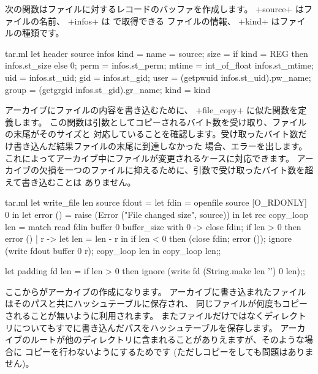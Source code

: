 \begin{answer}
次の関数はファイルに対するレコードのバッファを作成します。
\ml+source+ はファイルの名前、 \ml+infos+ は  で取得できる
ファイルの情報、 \ml+kind+ はファイルの種類です。
%
\begin{listingcodefile}{tar.ml}
let header source infos kind = {
  name = source;
  size = if kind = REG then infos.st_size else 0;
  perm = infos.st_perm;
  mtime = int_of_float infos.st_mtime;
  uid = infos.st_uid;
  gid = infos.st_gid;
  user = (getpwuid infos.st_uid).pw_name;
  group = (getgrgid infos.st_gid).gr_name;
  kind = kind }
\end{listingcodefile}
%
アーカイブにファイルの内容を書き込むために、 \ml+file_copy+ に似た関数を定義します。
この関数は引数としてコピーされるバイト数を受け取り、ファイルの末尾がそのサイズと
対応していることを確認します。受け取ったバイト数だけ書き込んだ結果ファイルの末尾に到達しなかった
場合、エラーを出します。これによってアーカイブ中にファイルが変更されるケースに対応できます。
アーカイブの欠損を一つのファイルに抑えるために、引数で受け取ったバイト数を超えて書き込むことは
ありません。
%
\begin{listingcodefile}{tar.ml}
let write_file len source fdout =
  let fdin = openfile source [O_RDONLY] 0 in
  let error () = raise (Error ("File changed size", source)) in
  let rec copy_loop len =
    match read fdin buffer 0 buffer_size with
      0 ->
        close fdin; if len > 0 then error ()
    | r ->
        let len = len - r  in
        if len < 0 then (close fdin; error ());
        ignore (write fdout buffer 0 r); copy_loop len in
  copy_loop len;;

let padding fd len =
  if len > 0 then ignore (write fd (String.make len '') 0 len);;
\end{listingcodefile}
%
ここからがアーカイブの作成になります。
アーカイブに書き込まれたファイルはそのパスと共にハッシュテーブルに保存され、
同じファイルが何度もコピーされることが無いように利用されます。
またファイルだけではなくディレクトリについてもすでに書き込んだパスをハッシュテーブルを保存します。
アーカイブのルートが他のディレクトリに含まれることがありえますが、そのような場合に
コピーを行わないようにするためです (ただしコピーをしても問題はありません)。


\end{answer}

